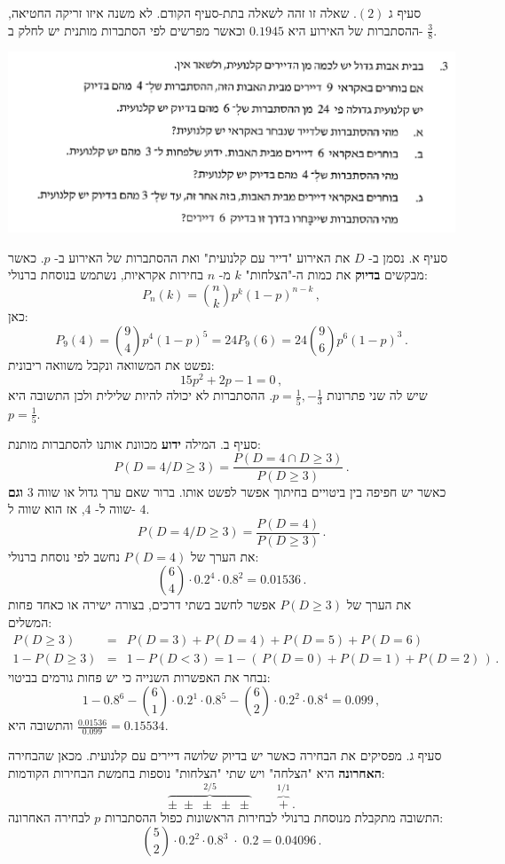 \documentclass[12pt,a4paper]{article}
\begin{document}
סעיף ג 
$(2)$.
שאלה זו זהה לשאלה בתת-סעיף הקודם. לא משנה איזו זריקה החטיאה, ההסתברות של האירוע היא 
$0.1945$
וכאשר מפרשים לפי הסתברות מותנית יש לחלק ב-%
$\frac{3}{8}$.

\textbf{}

\begin{center}
\includegraphics[width=.95\textwidth]{summer-2017a-3}
\end{center}

סעיף א. נסמן ב-%
$D$
את האירוע "דייר עם קלנועית" ואת ההסתברות של האירוע ב-%
$p$.
כאשר מבקשים
\textbf{בדיוק}
את כמות ה-"הצלחות" 
$k$
מ-%
$n$
בחירות אקראיות, נשתמש בנוסחת ברנולי:
\[
P_n(k)={n\choose k} p^k (1-p)^{n-k}\,,
\]
כאן:
\[
P_9(4)={9\choose 4} p^4 (1-p)^5=24P_9(6)=24 {9\choose 6} p^6 (1-p)^3\,.
\]
נפשט את המשוואה ונקבל משוואה ריבונית:
\[
15p^2+2p-1=0\,,
\]
שיש לה שני פתרונות
$p=\frac{1}{5},-\frac{1}{3}$.
ההסתברות לא יכולה להיות שלילית ולכן התשובה היא 
$p=\frac{1}{5}$.

סעיף ב. המילה
\textbf{ידוע}
מכוונת אותנו להסתברות מותנת:
\[
P(D=4/D\ge3) = \frac{P(D=4\cap D\ge 3)}{P(D\ge 3)}\,.
\]
כאשר יש חפיפה בין ביטויים בחיתוך אפשר לפשט אותו. ברור שאם ערך גדול או שווה
$3$
\textbf{וגם}
שווה ל-%
$4$,
אז הוא שווה ל-%
$4$.
\[
P(D=4/D\ge3) =\frac{P(D=4)}{P(D\ge 3)}\,.
\]
את הערך של
$P(D=4)$
נחשב לפי נוסחת ברנולי:
\[
{6\choose 4}\cdot 0.2^4 \cdot 0.8^2= 0.01536\,.
\]
את הערך של
$P(D\ge 3)$
אפשר לחשב בשתי דרכים, בצורה ישירה או כאחד פחות המשלים:
\begin{eqnarray*}
P(D\ge 3) &=& P(D=3) + P(D=4) + P(D=5) + P(D=6)\\
1-P(D\ge 3) &=& 1- P(D<3)=1-(\,P(D=0) + P(D=1) + P(D=2)\,)\,.
\end{eqnarray*}
נבחר את האפשרות השנייה כי יש פחות גורמים בביטוי:
\[
1-0.8^6-{6\choose 1}\cdot 0.2^1\cdot 0.8^5 - {6 \choose 2}\cdot 0.2^2\cdot 0.8^4=0.099\,,
\]
והתשובה היא
$\displaystyle\frac{0.01536}{0.099}=0.15534$.

סעיף ג. מפסיקים את הבחירה כאשר יש בדיוק שלושה דיירים עם קלנועית. מכאן שהבחירה 
\textbf{האחרונה} 
היא "הצלחה" ויש שתי "הצלחות" נוספות בחמשת הבחירות הקודמות:
\[
\overbrace{\pm\;\pm\;\pm\;\pm\;\pm}^{2/5}\quad\quad \overbrace{+}^{1/1}\,.
\]
התשובה מתקבלת מנוסחת ברנולי לבחירות הראשונות כפול ההסתברות
$p$
לבחירה האחרונה:
\[
{5\choose 2}\cdot 0.2^2 \cdot 0.8^3 \;\cdot\; 0.2=0.04096\,.
\]
\end{document}
